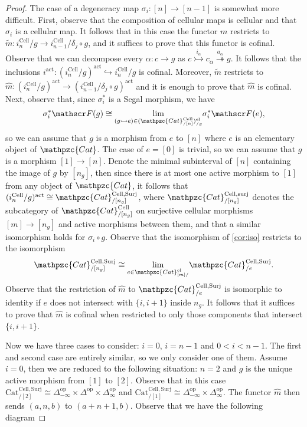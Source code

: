 \documentclass[a4paper, reqno]{amsart}
\theoremstyle{definition}
\newcommand\cF{\mathscr F}
\newcommand\op{\mathrm{op}}
\newcommand\ccat{\mathpzc{Cat}}
\newcommand\cell{\mathrm{Cell}}
\newcommand\act{\mathrm{act}}
\newcommand\sur{\mathrm{surj}}
\newcommand\el{\mathrm{el}}
\newcommand{\mElo}[2]{\mathpzc{#1}^{\mathrm{el}}_{#2/}}
\begin{document}
\begin{proof}
The case of a degeneracy map $\sigma_i:[n]\rightarrow[n-1]$ is somewhat more difficult. First, observe that the composition of cellular maps is cellular and that $\sigma_i$ is a cellular map. It follows that in this case the functor $m$ restricts to $\widetilde{m}:i_{n}^\mathrm{Cell}/g\rightarrow i_{n-1}^\mathrm{Cell}/\delta_j\circ g$, and it suffices to prove that this functor is cofinal. Observe that we can decompose every $\alpha:c\rightarrow g$ as $c\overset{i_\alpha}{\rightarrowtail}c_\alpha\overset{a_\alpha}{\twoheadrightarrow}g$. It follows that the inclusions $i^\act:(i_{n}^\mathrm{Cell}/g)^\act\hookrightarrow i_{n}^\mathrm{Cell}/g$ is cofinal. Moreover, $\widetilde{m}$ restricts to $\widehat{m}:(i_{n}^\mathrm{Cell}/g)^\act\rightarrow(i_{n-1}^\mathrm{Cell}/\delta_j\circ g)^\act$ and it is enough to prove that $\widehat{m}$ is cofinal. Next, observe that, since $\sigma_i^*$ is a Segal morphism, we have
\[\sigma_i^*\cF(g)\cong\underset{(g\rightarrowtail e)\in(\mathpzc{Cat}^\mathrm{Cell}_{/[n]})^\el_{/g}}{\lim}\sigma_i^*\cF(e),\]
so we can assume that $g$ is a morphism from $e$ to $[n]$ where $e$ is an elementary object of $\mathpzc{Cat}$. The case of $e=[0]$ is trivial, so we can assume that $g$ is a morphism $[1]\rightarrow [n]$. Denote the minimal subinterval of $[n]$ containing the image of $g$ by $[n_g]$, then since there is at most one active morphism to $[1]$ from any object of $\mathpzc{Cat}$, it follows that $(i_{n}^\mathrm{Cell}/g)^\act\cong\mathpzc{Cat}^{\mathrm{Cell},\mathrm{Surj}}_{/[n_g]}$, where $\ccat^{\cell,\sur}_{/[n_g]}$ denotes the subcategory of $\mathpzc{Cat}^{\mathrm{Cell}}_{/[n_g]}$ on surjective cellular morphisms $[m]\rightarrow[n_g]$ and active morphisms between them, and that a similar isomorphism holds for $\sigma_i\circ g$. Observe that the isomorphism of \cref{cor:iso} restricts to the isomorphism
\[\mathpzc{Cat}^{\mathrm{Cell},\mathrm{Surj}}_{/[n_g]}\cong\underset{e\in\mElo{Cat}{[m]}}{\lim}\mathpzc{Cat}^{\mathrm{Cell},\mathrm{Surj}}_{/e}.\]
Observe that the restriction of $\widehat{m}$ to $\mathpzc{Cat}^{\mathrm{Cell},\mathrm{Surj}}_{/e}$ is isomorphic to identity if $e$ does not intersect with $\{i,i+1\}$ inside $n_g$. It follows that it suffices to prove that $\widehat{m}$ is cofinal when restricted to only those components that intersect $\{i,i+1\}$.\par
Now we have three cases to consider: $i=0$, $i=n-1$ and $0<i<n-1$. The first and second case are entirely similar, so we only consider one of them. Assume $i=0$, then we are reduced to the following situation: $n=2$ and $g$ is the unique active morphism from $[1]$ to $[2]$. Observe that in this case $\mathrm{Cat}^{\mathrm{Cell},\mathrm{Surj}}_{/[2]}\cong \Delta^\op_{-\infty}\times\Delta^\op\times \Delta^\op_\infty$ and $\mathrm{Cat}^{\mathrm{Cell},\mathrm{Surj}}_{/[1]}\cong \Delta^\op_{-\infty}\times \Delta^\op_\infty$. The functor $\widehat{m}$ then sends $(a,n,b)$ to $(a+n+1,b)$. Observe that we have the following diagram

\end{proof}
\end{document}
